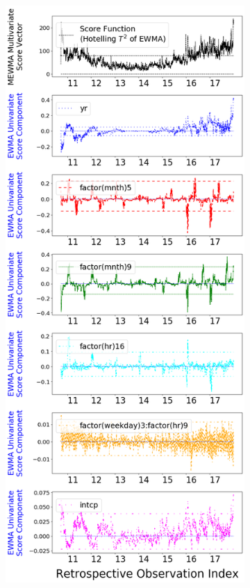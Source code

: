 \documentclass[twoside,11pt]{article}
\begin{document}
\begin{figure}[H]
\begin{subfigure}[t]{0.4\linewidth}
     \captionsetup{width=.95\linewidth}
     \caption{}
     \label{fig:bs_retro}
\end{subfigure}
\begin{subfigure}[t]{0.4\linewidth}
     \centering
         \includegraphics[width=1.0\textwidth, trim=.0in .0in .0in .0in, clip]{../figures/v14/bike_sharing/reg_lin_B_1/PII_neg_single_retro_bike_fisher_mlines_with_regu_1e-08_0_0001_0_01_99_99.png}

\end{subfigure}
\end{figure}
\end{document}
